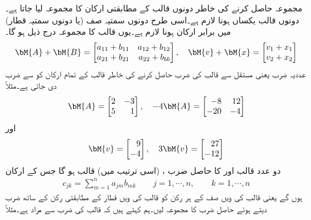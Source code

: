 مجموعہ حاصل کرنے کی خاطر دونوں قالب کے مطابقتی ارکان کا مجموعہ لیا جاتا ہے۔دونوں قالب یکساں  ہونا لازم ہے۔اسی طرح دونوں سمتیہ صف (یا دونوں سمتیہ قطار) میں برابر ارکان ہونا لازم ہے۔یوں  قالب کا مجموعہ درج ذیل ہو گا۔
\begin{align}
\bM{A}+\bM{B}=
\begin{bmatrix*}[r]
a_{11}+b_{11} & a_{12}+b_{12}\\
a_{21}+b_{21}& a_{22}+b_{bb}
\end{bmatrix*}, \quad \bM{v}+\bM{x}=
\begin{bmatrix*}[r]
v_1+x_1\\
v_2+x_2
\end{bmatrix*}
\end{align} 
 عددیہ ضرب یعنی مستقل   سے قالب کی ضرب حاصل کرنے کی خاطر قالب کے تمام ارکان کو  سے ضرب دی  جاتی ہے۔مثلاً 
\begin{align*}
\bM{A}=
\begin{bmatrix*}[r]
2& -3\\
5&1
\end{bmatrix*}, \quad 
-4\bM{A}=
\begin{bmatrix*}[r]
-8&12\\
-20&-4
\end{bmatrix*}
\end{align*}
اور
\begin{align*}
\bM{v}=
\begin{bmatrix*}[r]
9\\
-4
\end{bmatrix*}, \quad 
3\bM{v}=
\begin{bmatrix*}[r]
27\\
-12
\end{bmatrix*}
\end{align*}
دو عدد  قالب  اور   کا حاصل ضرب ، (اسی ترتیب میں)  قالب  ہو گا جس کے ارکان 
\begin{align}
c_{jk}=\sum_{m=1}^{n} a_{jm} b_{mk} \quad \quad j=1, \cdots, n, \quad\quad k=1,\cdots,n
\end{align}
ہوں گے یعنی  قالب کی    ویں صف کے ہر رکن کو  قالب کی   ویں قطار کے مطابقتی رکن کے ساتھ ضرب دیتے ہوئے  حاصل ضرب  کا مجموعہ لیں۔ہم کہتے ہیں کہ قالب کی  ضرب سے مراد   ہے۔مثلاً
